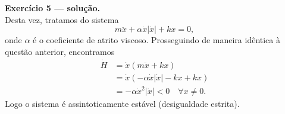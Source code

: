 	\noindent
	\textbf{\sffamily Exercício 5 --- solução.} \\
	Desta vez, tratamos do sistema 
	\[
		m\ddot{x} + \alpha \dot{x}|\dot{x}| + kx = 0,
	\]
	onde $\alpha$ é o coeficiente de atrito viscoso.
	Prosseguindo de maneira idêntica à questão anterior, encontramos
	\begin{align*}
		\dot{H} &= \dot{x}(m\ddot{x} + kx) \\
		        &= \dot{x}(-\alpha\dot{x}|\dot{x}| - kx + kx) \\
		        &= -\alpha\dot{x}^2|\dot{x}| 
		        < 0 \quad\forall x\neq 0.
	\end{align*}
	Logo o sistema é assintoticamente estável (desigualdade estrita).
	
	
	